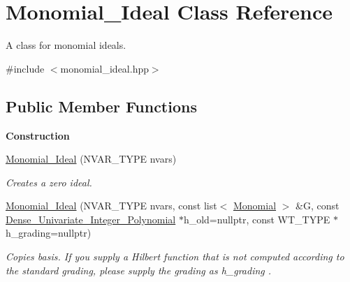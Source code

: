 \hypertarget{class_monomial___ideal}{}\section{Monomial\+\_\+\+Ideal Class Reference}
\label{class_monomial___ideal}


A class for monomial ideals.  




{\ttfamily \#include $<$monomial\+\_\+ideal.\+hpp$>$}

\subsection*{Public Member Functions}
\begin{Indent}\textbf{ Construction}\par
\begin{DoxyCompactItemize}
\item 
\mbox{\label{class_monomial___ideal_a1c1ca0ff8991217e18bb263c7ecfc316}} 
\hyperlink{class_monomial___ideal_a1c1ca0ff8991217e18bb263c7ecfc316}{Monomial\+\_\+\+Ideal} (N\+V\+A\+R\+\_\+\+T\+Y\+PE nvars)
\begin{DoxyCompactList}\small\item\em Creates a zero ideal. \end{DoxyCompactList}\item 
\mbox{\label{class_monomial___ideal_a7db4fc98fce195b0d0ba5fa9c89292a0}} 
\hyperlink{class_monomial___ideal_a7db4fc98fce195b0d0ba5fa9c89292a0}{Monomial\+\_\+\+Ideal} (N\+V\+A\+R\+\_\+\+T\+Y\+PE nvars, const list$<$ \hyperlink{class_monomial}{Monomial} $>$ \&G, const \hyperlink{class_dense___univariate___integer___polynomial}{Dense\+\_\+\+Univariate\+\_\+\+Integer\+\_\+\+Polynomial} $\ast$h\+\_\+old=nullptr, const W\+T\+\_\+\+T\+Y\+PE $\ast$h\+\_\+grading=nullptr)
\begin{DoxyCompactList}\small\item\em Copies {\ttfamily basis}. If you supply a Hilbert function that is not computed according to the standard grading, please supply the grading as {\ttfamily h\+\_\+grading} . \end{DoxyCompactList}\item 
\mbox{\label{class_monomial___ideal_af10301d05f7eac529acca28831e54eac}} 

\end{DoxyCompactItemize}
\end{Indent}
